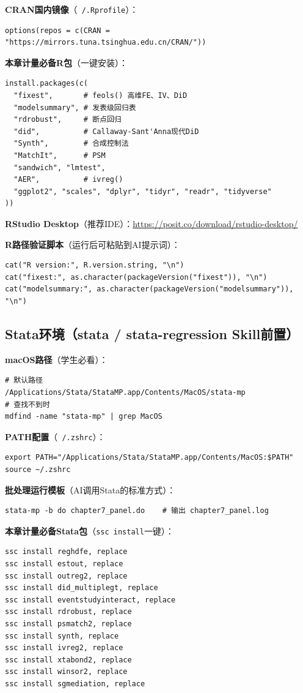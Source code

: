\textbf{CRAN国内镜像}（\texttt{~/.Rprofile}）：
\begin{lstlisting}[style=r]
options(repos = c(CRAN = "https://mirrors.tuna.tsinghua.edu.cn/CRAN/"))
\end{lstlisting}

\textbf{本章计量必备R包}（一键安装）：
\begin{lstlisting}[style=r]
install.packages(c(
  "fixest",       # feols() 高维FE、IV、DiD
  "modelsummary", # 发表级回归表
  "rdrobust",     # 断点回归
  "did",          # Callaway-Sant'Anna现代DiD
  "Synth",        # 合成控制法
  "MatchIt",      # PSM
  "sandwich", "lmtest",
  "AER",          # ivreg()
  "ggplot2", "scales", "dplyr", "tidyr", "readr", "tidyverse"
))
\end{lstlisting}

\textbf{RStudio Desktop}（推荐IDE）：\url{https://posit.co/download/rstudio-desktop/}

\textbf{R路径验证脚本}（运行后可粘贴到AI提示词）：
\begin{lstlisting}[style=r]
cat("R version:", R.version.string, "\n")
cat("fixest:", as.character(packageVersion("fixest")), "\n")
cat("modelsummary:", as.character(packageVersion("modelsummary")), "\n")
\end{lstlisting}

\subsection{Stata环境（stata / stata-regression Skill前置）}

\textbf{macOS路径}（学生必看）：
\begin{lstlisting}[style=shell]
# 默认路径
/Applications/Stata/StataMP.app/Contents/MacOS/stata-mp
# 查找不到时
mdfind -name "stata-mp" | grep MacOS
\end{lstlisting}

\textbf{PATH配置}（\texttt{~/.zshrc}）：
\begin{lstlisting}[style=shell]
export PATH="/Applications/Stata/StataMP.app/Contents/MacOS:$PATH"
source ~/.zshrc
\end{lstlisting}

\textbf{批处理运行模板}（AI调用Stata的标准方式）：
\begin{lstlisting}[style=shell]
stata-mp -b do chapter7_panel.do    # 输出 chapter7_panel.log
\end{lstlisting}

\textbf{本章计量必备Stata包}（\texttt{ssc install}一键）：
\begin{lstlisting}[style=stata]
ssc install reghdfe, replace
ssc install estout, replace
ssc install outreg2, replace
ssc install did_multiplegt, replace
ssc install eventstudyinteract, replace
ssc install rdrobust, replace
ssc install psmatch2, replace
ssc install synth, replace
ssc install ivreg2, replace
ssc install xtabond2, replace
ssc install winsor2, replace
ssc install sgmediation, replace
\end{lstlisting}

